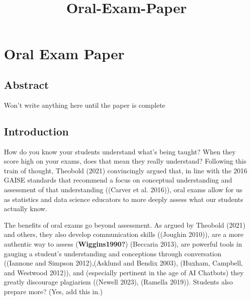\documentclass[
  letterpaper,
  DIV=11,
  numbers=noendperiod]{scrartcl}
\title{Oral-Exam-Paper}
\author{}
\date{}
\begin{document}
\maketitle
\ifdefined\Shaded\renewenvironment{Shaded}{\begin{tcolorbox}[enhanced, boxrule=0pt, sharp corners, interior hidden, borderline west={3pt}{0pt}{shadecolor}, breakable, frame hidden]}{\end{tcolorbox}}\fi

\hypertarget{oral-exam-paper}{%
\section{Oral Exam Paper}\label{oral-exam-paper}}

\hypertarget{abstract}{%
\subsection{Abstract}\label{abstract}}

Won't write anything here until the paper is complete

\hypertarget{introduction}{%
\subsection{Introduction}\label{introduction}}

How do you know your students understand what's being taught? When they
score high on your exams, does that mean they really understand?
Following this train of thought, Theobold (2021) convincingly argued
that, in line with the 2016 GAISE standards that recommend a focus on
conceptual understanding and assessment of that understanding ((Carver
et al. 2016)), oral exams allow for us as statistics and data science
educators to more deeply assess what our students actually know.

The benefits of oral exams go beyond assessment. As argued by Theobold
(2021) and others, they also develop communication skills ((Joughin
2010)), are a more authentic way to assess (\textbf{Wiggins1990?})
(Beccaria 2013), are powerful tools in gauging a student's understanding
and conceptions through conversation ((Iannone and Simpson
2012),(Asklund and Bendix 2003), (Huxham, Campbell, and Westwood 2012)),
and (especially pertinent in the age of AI Chatbots) they greatly
discourage plagiarism ((Newell 2023), (Ramella 2019)). Students also
prepare more? (Yes, add this in.)
\end{document}
